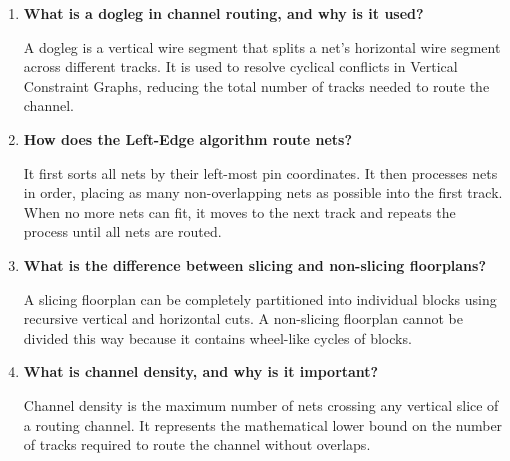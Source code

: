 \documentclass[12pt,a4paper]{article}
\newcommand{\Q}[1]{\textbf{#1}\par\noindent\ignorespaces}
\begin{document}
\begin{tcolorbox}[exambox, title={\textbf{Frequently Asked / Viva Questions}}]
\begin{enumerate}[leftmargin=*, topsep=0pt, label=\textbf{Q\arabic*.}, itemsep=6pt]
  \item \Q{What is a dogleg in channel routing, and why is it used?}
        A dogleg is a vertical wire segment that splits a net's horizontal wire segment across different tracks. It is used to resolve cyclical conflicts in Vertical Constraint Graphs, reducing the total number of tracks needed to route the channel.
        
  \item \Q{How does the Left-Edge algorithm route nets?}
        It first sorts all nets by their left-most pin coordinates. It then processes nets in order, placing as many non-overlapping nets as possible into the first track. When no more nets can fit, it moves to the next track and repeats the process until all nets are routed.
        
  \item \Q{What is the difference between slicing and non-slicing floorplans?}
        A slicing floorplan can be completely partitioned into individual blocks using recursive vertical and horizontal cuts. A non-slicing floorplan cannot be divided this way because it contains wheel-like cycles of blocks.
        
  \item \Q{What is channel density, and why is it important?}
        Channel density is the maximum number of nets crossing any vertical slice of a routing channel. It represents the mathematical lower bound on the number of tracks required to route the channel without overlaps.
\end{enumerate}
\end{tcolorbox}

\vspace{6pt}
\end{document}
